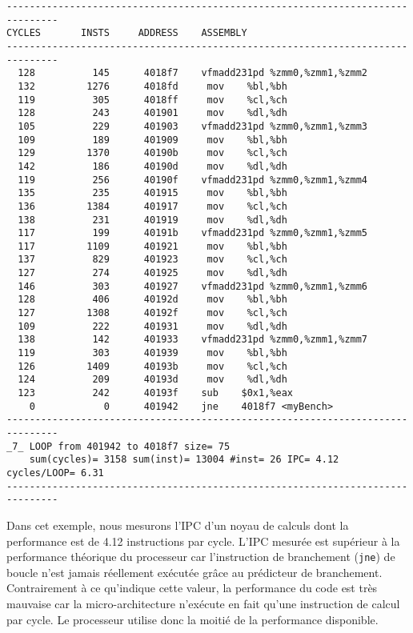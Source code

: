 \begin{lstlisting}[label=lst:dev_op_ipc_missleading, caption=Noyau de calcul n'exécutant qu'une opération de calcul par cycle.]
-------------------------------------------------------------------------------
CYCLES       INSTS     ADDRESS    ASSEMBLY                         
-------------------------------------------------------------------------------
  128          145      4018f7    vfmadd231pd %zmm0,%zmm1,%zmm2
  132         1276      4018fd     mov    %bl,%bh
  119          305      4018ff     mov    %cl,%ch
  128          243      401901     mov    %dl,%dh
  105          229      401903    vfmadd231pd %zmm0,%zmm1,%zmm3
  109          189      401909     mov    %bl,%bh
  129         1370      40190b     mov    %cl,%ch
  142          186      40190d     mov    %dl,%dh
  119          256      40190f    vfmadd231pd %zmm0,%zmm1,%zmm4
  135          235      401915     mov    %bl,%bh
  136         1384      401917     mov    %cl,%ch
  138          231      401919     mov    %dl,%dh
  117          199      40191b    vfmadd231pd %zmm0,%zmm1,%zmm5
  117         1109      401921     mov    %bl,%bh
  137          829      401923     mov    %cl,%ch
  127          274      401925     mov    %dl,%dh
  146          303      401927    vfmadd231pd %zmm0,%zmm1,%zmm6
  128          406      40192d     mov    %bl,%bh
  127         1308      40192f     mov    %cl,%ch
  109          222      401931     mov    %dl,%dh
  138          142      401933    vfmadd231pd %zmm0,%zmm1,%zmm7
  119          303      401939     mov    %bl,%bh
  126         1409      40193b     mov    %cl,%ch
  124          209      40193d     mov    %dl,%dh
  123          242      40193f    sub    $0x1,%eax
    0            0      401942    jne    4018f7 <myBench>
-------------------------------------------------------------------------------
_7_ LOOP from 401942 to 4018f7 size= 75 
    sum(cycles)= 3158 sum(inst)= 13004 #inst= 26 IPC= 4.12 cycles/LOOP= 6.31
-------------------------------------------------------------------------------
\end{lstlisting} 
        
        
        Dans cet exemple, nous mesurons l'IPC d'un noyau de calculs dont la performance est de 4.12 instructions par cycle. L'IPC mesurée est supérieur à la performance théorique du processeur car l'instruction de branchement (\verb=jne=) de boucle n'est jamais réellement exécutée grâce au prédicteur de branchement. Contrairement à ce qu'indique cette valeur, la performance du code est très mauvaise car la micro-architecture n'exécute en fait qu'une instruction de calcul par cycle. Le processeur utilise donc la moitié de la performance disponible.
    
